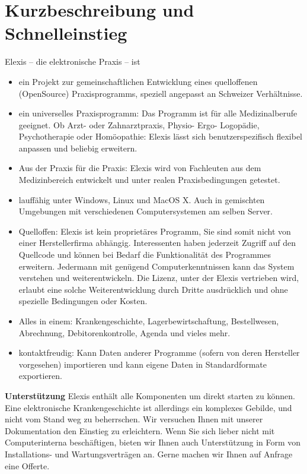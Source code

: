 \documentclass[paper=a4,BCOR8.25mm,twoside]{scrbook}
\begin{document}
\chapter{Kurzbeschreibung und Schnelleinstieg}
Elexis -- die elektronische Praxis -- ist
\begin{itemize}
	\item ein Projekt zur gemeinschaftlichen Entwicklung eines quelloffenen (OpenSource) Praxisprogramms,
speziell angepasst an Schweizer Verhältnisse.
	\item  ein universelles Praxisprogramm:  Das Programm ist für alle Medizinalberufe geeignet. Ob Arzt- oder
Zahnarztpraxis, Physio- Ergo- Logopädie, Psychotherapie oder Homöopathie: Elexis lässt sich benutzerspezifisch
flexibel anpassen und beliebig erweitern.
	\item Aus der Praxis für die Praxis: Elexis wird von Fachleuten aus dem Medizinbereich entwickelt und unter realen Praxisbedingungen getestet.

	\item lauffähig unter Windows, Linux und MacOS X. Auch
	in gemischten Umgebungen mit verschiedenen Computersystemen am selben Server.
	\item Quelloffen: Elexis ist kein proprietäres Programm, Sie sind somit nicht
	von einer Herstellerfirma abhängig. Interessenten haben jederzeit Zugriff auf
	den Quellcode und können bei Bedarf die Funktionalität des Programmes erweitern.
Jedermann mit genügend Computerkenntnissen kann das System verstehen und weiterentwickeln.
Die Lizenz, unter der Elexis vertrieben wird, erlaubt eine solche Weiterentwicklung durch Dritte ausdrücklich
und ohne spezielle Bedingungen oder Kosten.

	\item Alles in einem: Krankengeschichte, Lagerbewirtschaftung,
	Bestellwesen, Abrechnung, Debitorenkontrolle, Agenda und vieles mehr.
  	\item kontaktfreudig: Kann Daten anderer Programme (sofern von deren
 	Hersteller vorgesehen) importieren und kann eigene Daten in Standardformate
 	exportieren.
\end{itemize}
\pagebreak[3]
\textbf{Unterstützung}
Elexis enthält alle Komponenten um direkt starten zu können.
Eine elektronische Krankengeschichte ist allerdings ein komplexes Gebilde, und nicht vom Stand weg zu
beherrschen. Wir versuchen Ihnen mit unserer Dokumentation den Einstieg zu erleichtern. Wenn Sie sich lieber nicht mit Computerinterna beschäftigen, bieten wir Ihnen auch Unterstützung in Form von Installations- und Wartungsverträgen
an. Gerne machen wir Ihnen auf Anfrage eine Offerte.
\end{document}
